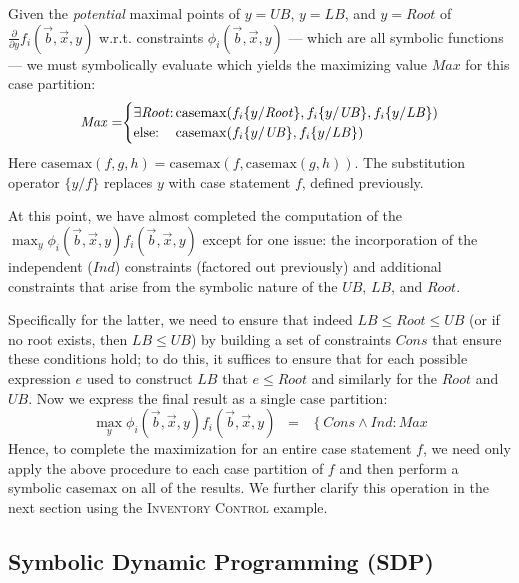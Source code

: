 \documentclass[twoside,11pt]{article}
\newcommand{\casemax}{\mathrm{casemax}}
\newcommand{\UB}{\mathit{UB}}
\newcommand{\LB}{\mathit{LB}}
\newcommand{\IND}{\mathit{Ind}}
\newcommand{\CONS}{\mathit{Cons}}
\newcommand{\Root}{\mathit{Root}}
\newcommand{\Max}{\mathit{Max}}
\newcommand{\sq}{\hspace{-1mm}}
\newcommand{\sqm}{\hspace{-2mm}}
\newcommand{\InventoryControl}{\textsc{Inventory Control }}
\begin{document}
Given the \emph{potential} maximal points of $y = \UB$, $y = \LB$, and
$y = \Root$ of $\frac{\partial}{\partial y} f_i(\vec{b},\vec{x},y)$
w.r.t. constraints $\phi_i(\vec{b},\vec{x},y)$ --- which are all
symbolic functions --- we must symbolically evaluate which yields the
maximizing value $\Max$ for this case partition:
\vspace{2mm}
{%
\begin{align*}
\Max =  \sq \begin{cases}
\mbox{$\exists \Root$}  \sq: \sq & \sqm \casemax( f_i \{ y / \Root \}, f_i \{ y / \UB \}, f_i \{ y / \LB \})\\
\mbox{else}  \sq:  \sq & \sqm \casemax( f_i \{ y / \UB \}, f_i \{ y / \LB \})
\end{cases}
\end{align*}}
Here $\casemax(f,g,h) = \casemax(f,\casemax(g,h))$.  The 
substitution operator $\{ y / f \}$ replaces $y$ with case statement $f$, 
defined previously.

At this point, we have almost completed the computation
of the $\max_y \phi_i(\vec{b},\vec{x},y) f_i(\vec{b},\vec{x},y)$
except for one issue: the incorporation of the independent ($\IND$) constraints
(factored out previously) and additional constraints that arise from the
symbolic nature of the $\UB$, $\LB$, and $\Root$.  

Specifically for the latter, we need to ensure that indeed $\LB \leq \Root \leq \UB$
(or if no root exists, then $\LB \leq \UB$) by building a set
of constraints $\CONS$ that ensure these conditions hold; to do this,
it suffices to ensure that for each possible expression $e$ used to
construct $\LB$ that $e \leq \Root$ and similarly for the $Root$ and $\UB$.
Now we express the final result as a single case partition:
\begin{equation*}
\max_y \phi_i(\vec{b},\vec{x},y) f_i(\vec{b},\vec{x},y) \;\; = \;\;
\left\{ \CONS \land \IND: \Max \right.
\end{equation*}
Hence, to complete the maximization for an entire case statement $f$, we need only apply the above procedure to each case partition of $f$ and then perform a symbolic $\casemax$ on all of the results. We further clarify this operation in the next section using the \InventoryControl  example.  

\subsection{Symbolic Dynamic Programming (SDP)}
\end{document}
